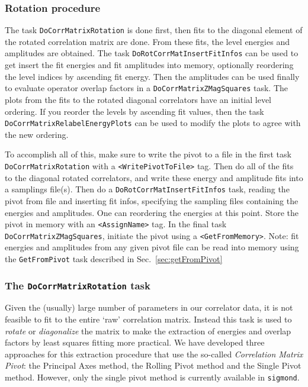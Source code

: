 \documentclass[12pt]{article}
\newcommand{\vb}{\texttt}
\begin{document}
\subsubsection{Rotation procedure}

The task \vb{DoCorrMatrixRotation} is done first, then fits to the diagonal     
element of the rotated correlation matrix are done.  From these fits,        
the level energies and amplitudes are obtained.  The task                    
\vb{DoRotCorrMatInsertFitInfos} can be used to get insert the fit energies and  
fit amplitudes into memory, optionally reordering the level indices by       
ascending fit energy.  Then the amplitudes can be used finally to evaluate   
operator overlap factors in a \vb{DoCorrMatrixZMagSquares} task.  The plots     
from the fits to the rotated diagonal correlators have an initial level      
ordering.  If you reorder the levels by ascending fit values, then the       
task \vb{DoCorrMatrixRelabelEnergyPlots} can be used to modify the plots to     
agree with the new ordering.                                                 
                                                                             
To accomplish all of this, make sure to write the pivot to a file in the     
first task \newline \vb{DoCorrMatrixRotation} with a \vb{<WritePivotToFile>} tag.  Then       
do all of the fits to the diagonal rotated correlators, and write these      
energy and amplitude fits into a samplings file(s).  Then do a               
\vb{DoRotCorrMatInsertFitInfos} task, reading the pivot from file and inserting 
fit infos, specifying the sampling files containing the energies and         
amplitudes.  One can reordering the energies at this point.  Store the pivot 
in memory with an \vb{<AssignName>} tag. In the final task                        
\vb{DoCorrMatrixZMagSquares}, initiate the pivot using a \vb{<GetFromMemory>}.       
Note: fit energies and amplitudes from any given pivot file can be read into
memory using the \vb{GetFromPivot} task described in Sec.~\ref{sec:getFromPivot}

\subsubsection{The \vb{DoCorrMatrixRotation} task} 
\label{sec:rotation}
Given the (usually) large number of parameters in our correlator data,
it is not feasible to fit to the entire `raw' correlation matrix. Instead
this task is used to \textit{rotate} or \textit{diagonalize} the matrix to
make the extraction of energies and overlap factors by least squares fitting
more practical. We have developed three approaches for this extraction procedure that use
the so-called \textit{Correlation Matrix Pivot}: the Principal Axes method, the
Rolling Pivot method and the Single Pivot method.  However, only the single pivot
method is currently available in \vb{sigmond}.
\end{document}
